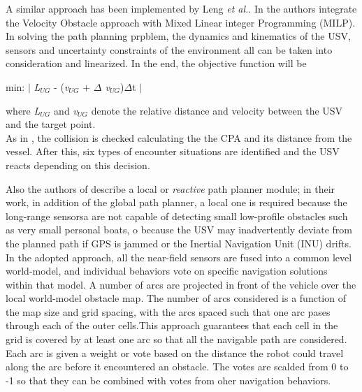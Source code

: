 \documentclass[journal]{IEEEtran}
\begin{document}
              \indent A similar approach has been implemented by Leng \textit{et al.}. In \cite{Leng2013} the authors integrate the Velocity Obstacle approach with Mixed Linear integer Programming (MILP). In solving the path planning prpblem, the dynamics and kinematics of the USV, sensors and uncertainty constraints of the environment all can be taken into consideration and linearized. In the end, the objective function will be
                  \begin{center}
                    min: $ \mid $ \textit{L$_{UG}$} - (\textit{v$_{UG}$} + \textit{$\Delta$ v$_{UG}$})$\Delta$t $ \mid$
                  \end{center}
              where \textit{L$_{UG}$} and \textit{v$_{UG}$} denote the relative distance and velocity between the USV and the target point.\\
              As in \cite{Kuwata2014}, the collision is checked calculating the the CPA and its distance from the vessel. After this, six types of encounter situations are identified and the USV reacts depending on this decision.

              \indent Also the authors of \cite{Larson2007,Larson2007a} describe a local or \textit{reactive} path planner module; in their work, in addition of the global path planner, a local one is required because the long-range sensorsa are not capable of detecting small low-profile obstacles such as very small personal boats, o because the USV may inadvertently deviate from the planned path if GPS is jammed or the Inertial Navigation Unit (INU) drifts. \\
              In the adopted approach, all the near-field sensors are fused into a common level world-model, and individual behaviors vote on specific navigation solutions within that model. A number of arcs are projected in front of the vehicle over the local world-model obstacle map. The number of arcs considered is a function of the map size and grid spacing, with the arcs spaced such that one arc pases through each of the outer cells.This approach guarantees that each cell in the grid is covered by at least one arc so that all the navigable path are considered. Each arc is given a weight or vote based on the distance the robot could travel along the arc before it encountered an obstacle. The votes are scalded from 0 to -1 so that they can be combined with votes from oher navigation behaviors.\\
\end{document}
